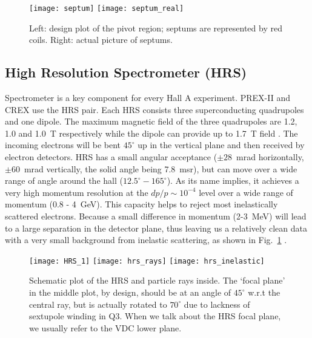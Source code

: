 \begin{figure}[!h]
    \texttt{[image: septum]}
    \texttt{[image: septum\_real]}
    \caption[pivot region]
    {Left: design plot of the pivot region; septums are represented by
    red coils. Right: actual picture of septums.
    }
\end{figure}

\subsection{High Resolution Spectrometer (HRS)}
Spectrometer is a key component for every Hall A experiment. PREX-II and CREX
use the HRS pair. Each HRS consists three superconducting
quadrupoles and one dipole. The maximum magnetic field of the three quadrupoles are
1.2, 1.0 and 1.0~T respectively while the dipole can provide up to 1.7~T field \cite{halla_manual}. 
The incoming electrons will be bent $45^\circ$ up in the vertical plane and then
received by electron detectors.
HRS has a small angular acceptance ($\pm 28$~mrad horizontally, $\pm 60$~mrad vertically, 
the solid angle being 7.8~msr), but can move over a wide range of angle
around the hall ($12.5^\circ - 165^\circ$). As its name implies, it achieves a 
very high momentum resolution at the $dp/p \sim 10^{-4}$ level over a wide range of momentum 
(0.8 - 4~GeV). This capacity helps to reject most inelastically scattered electrons.
Because a small difference in momentum (2-3~MeV) will lead to a
large separation in the detector plane, thus leaving us a relatively clean data 
with a very small background from inelastic scattering, as shown in Fig.~\ref{fig:HRS} .

\begin{figure}[!h]
    \centering
    \texttt{[image: HRS\_1]}
    \texttt{[image: hrs\_rays]}
    \texttt{[image: hrs\_inelastic]}
    \caption[HRS]{Schematic plot of the HRS and particle rays inside. \cite{halla3d}
    The `focal plane' in the middle plot, by design, should be at an angle of $45^\circ$
    w.r.t the central ray, but is actually rotated to $70^\circ$ due to lackness
    of sextupole winding in Q3. When we talk about the HRS focal plane, we
    usually refer to the VDC lower plane.
    }
    \label{fig:HRS}
\end{figure}


